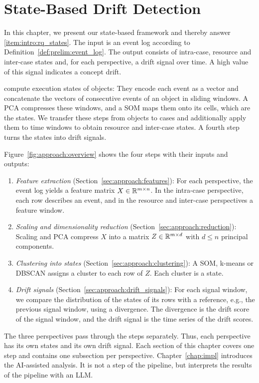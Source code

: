 \chapter{State-Based Drift Detection}
\label{chap:approach}
In this chapter, we present our state-based framework and thereby answer \ref{item:intro:rq_states}. The input is an event log according to Definition~\ref{def:prelim:event_log}. The output consists of intra-case, resource and inter-case states and, for each perspective, a drift signal over time. A high value of this signal indicates a concept drift.

\textcite{berti2025ocel} compute execution states of objects: They encode each event as a vector and concatenate the vectors of consecutive events of an object in sliding windows. A PCA compresses these windows, and a SOM maps them onto its cells, which are the states. We transfer these steps from objects to cases and additionally apply them to time windows to obtain resource and inter-case states. A fourth step turns the states into drift signals.

Figure~\ref{fig:approach:overview} shows the four steps with their inputs and outputs:
\begin{enumerate}
	\item \emph{Feature extraction} (Section~\ref{sec:approach:features}): For each perspective, the event log yields a feature matrix $X \in \mathbb R^{m \times n}$. In the intra-case perspective, each row describes an event, and in the resource and inter-case perspectives a feature window.
	\item \emph{Scaling and dimensionality reduction} (Section~\ref{sec:approach:reduction}): Scaling and PCA compress $X$ into a matrix $Z \in \mathbb R^{m \times d}$ with $d \le n$ principal components.
	\item \emph{Clustering into states} (Section~\ref{sec:approach:clustering}): A SOM, k-means or DBSCAN assigns a cluster to each row of $Z$. Each cluster is a state.
	\item \emph{Drift signals} (Section~\ref{sec:approach:drift_signals}): For each signal window, we compare the distribution of the states of its rows with a reference, e.g., the previous signal window, using a divergence. The divergence is the drift score of the signal window, and the drift signal is the time series of the drift scores.
\end{enumerate}

The three perspectives pass through the steps separately. Thus, each perspective has its own states and its own drift signal. Each section of this chapter covers one step and contains one subsection per perspective. Chapter~\ref{chap:impl} introduces the AI-assisted analysis. It is not a step of the pipeline, but interprets the results of the pipeline with an LLM.

